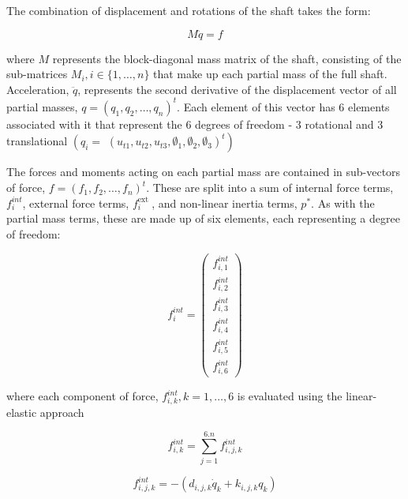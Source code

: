 The combination of displacement and rotations of the shaft takes the form:

\begin{equation}\label{ShaftEquilibrium}
	M \ddot{q}=f
\end{equation}

where $M$ represents the block-diagonal mass matrix of the shaft, consisting of the sub-matrices $M_i, i \in\{1, \ldots, n\}$ that make up each partial mass of the full shaft. Acceleration, $\ddot{q}$, represents the second derivative of the displacement vector of all partial masses, $q=\left(q_1, q_2, \ldots, q_n\right)^t$. Each element of this vector has 6 elements associated with it that represent the 6 degrees of freedom - 3 rotational and 3 translational $\left(q_i=\right.$ $\left.\left(u_{t 1}, u_{t 2}, u_{t 3}, \emptyset_1, \emptyset_2, \emptyset_3\right)^t\right)$

The forces and moments acting on each partial mass are contained in sub-vectors of force, $f=\left(f_1, f_2, \ldots, f_n\right)^t$. These are split into a sum of internal force terms, $f_i^{i n t}$, external force terms, $f_i^{\text {ext }}$, and non-linear inertia terms, $p^*$. As with the partial mass terms, these are made up of six elements, each representing a degree of freedom:

\begin{equation}\label{Partial mass force}
	f_i^{i n t}=\left(\begin{array}{c}
		f_{i, 1}^{i n t} \\
		f_{i, 2}^{i n t} \\
		f_{i, 3}^{i n t} \\
		f_{i, 4}^{i n t} \\
		f_{i, 5}^{i n t} \\
		f_{i, 6}^{i n t}
	\end{array}\right)
\end{equation}

where each component of force, $f_{i, k}^{i n t}, k=1, \ldots, 6$ is evaluated using the linear-elastic approach

\begin{equation}\label{Partial mass force 6 dof}
	f_{i, k}^{i n t}=\sum_{j=1}^{6 . n} f_{i, j, k}^{i n t}
\end{equation}

\begin{equation}\label{Partial mass force 6 dof terms}
	f_{i, j, k}^{i n t}=-\left(d_{i, j, k} \dot{q}_k+k_{i, j, k} q_k\right)
\end{equation}

